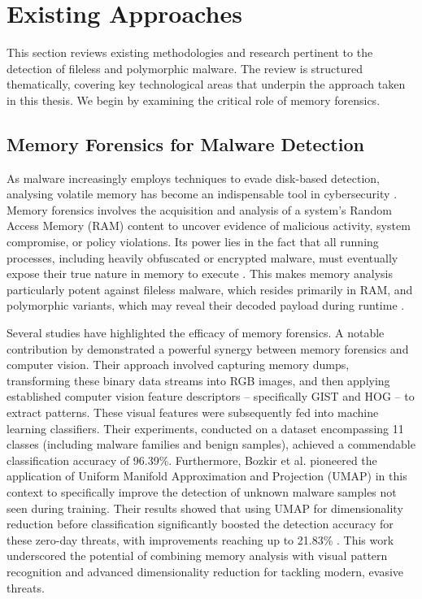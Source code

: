 \section{Existing Approaches}
\label{sec:existing_approaches}

This section reviews existing methodologies and research pertinent to the detection of fileless and polymorphic malware. The review is structured thematically, covering key technological areas that underpin the approach taken in this thesis. We begin by examining the critical role of memory forensics.

\subsection{Memory Forensics for Malware Detection}
\label{subsec:mem_forensics}

As malware increasingly employs techniques to evade disk-based detection, analysing volatile memory has become an indispensable tool in cybersecurity \citep{kara2022fileless}. Memory forensics involves the acquisition and analysis of a system's Random Access Memory (RAM) content to uncover evidence of malicious activity, system compromise, or policy violations. Its power lies in the fact that all running processes, including heavily obfuscated or encrypted malware, must eventually expose their true nature in memory to execute \citep{bozkir2021catch}. This makes memory analysis particularly potent against fileless malware, which resides primarily in RAM, and polymorphic variants, which may reveal their decoded payload during runtime \citep{sihag2021assistive, hanchenko2024analysis}.

Several studies have highlighted the efficacy of memory forensics. A notable contribution by \citet{bozkir2021catch} demonstrated a powerful synergy between memory forensics and computer vision. Their approach involved capturing memory dumps, transforming these binary data streams into RGB images, and then applying established computer vision feature descriptors – specifically GIST \citep{oliva2001modeling} and HOG \citep{dalal2005histograms} – to extract patterns. These visual features were subsequently fed into machine learning classifiers. Their experiments, conducted on a dataset encompassing 11 classes (including malware families and benign samples), achieved a commendable classification accuracy of 96.39\%. Furthermore, Bozkir et al. pioneered the application of Uniform Manifold Approximation and Projection (UMAP) \citep{mcinnes2018umap} in this context to specifically improve the detection of unknown malware samples not seen during training. Their results showed that using UMAP for dimensionality reduction before classification significantly boosted the detection accuracy for these zero-day threats, with improvements reaching up to 21.83\% \citep{bozkir2021catch}. This work underscored the potential of combining memory analysis with visual pattern recognition and advanced dimensionality reduction for tackling modern, evasive threats.

